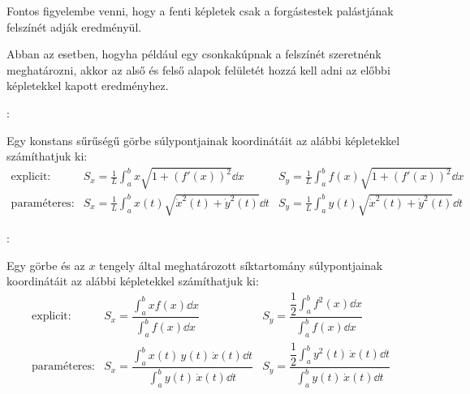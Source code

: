 \documentclass[a4paper, 12pt]{scrartcl}
\begin{document}
\begin{note}
  Fontos figyelembe venni, hogy a fenti képletek csak a forgástestek palástjának
  felszínét adják eredményül.

  Abban az esetben, hogyha például egy csonkakúpnak a felszínét szeretnénk
  meghatározni, akkor az alső és felső alapok felületét hozzá kell adni
  az előbbi képletekkel kapott eredményhez.
\end{note}

\begin{blueBox}
  :

  Egy konstans sűrűségű görbe súlypontjainak koordinátáit az alábbi képletekkel
  számíthatjuk ki:
  \[
    \begin{array}{lll}
      \text{explicit:}    & \displaystyle S_x = \frac{1}{L} \int_a^b x \sqrt{1 + (f'(x))^2} \dd x
                          & \displaystyle S_y = \frac{1}{L} \int_a^b f(x) \sqrt{1 + (f'(x))^2} \dd x
      \\[7mm]
      \text{paraméteres:} & \displaystyle S_x = \frac{1}{L} \int_a^b x(t) \sqrt{{\dot x}^2(t) + {\dot y}^2(t)} \dd t
                          & \displaystyle S_y = \frac{1}{L} \int_a^b y(t) \sqrt{{\dot x}^2(t) + {\dot y}^2(t)} \dd t
    \end{array}
  \]
\end{blueBox}

\begin{blueBox}
  :

  Egy görbe és az $x$ tengely által meghatározott síktartomány súlypontjainak
  koordinátáit az alábbi képletekkel számíthatjuk ki:
  \def\arraycolsep{20pt}
  \[
    \begin{array}{lll}
      \text{explicit:}    & \displaystyle S_x = \dfrac{\displaystyle\int_a^b x f(x) \dd x}{\displaystyle\int_a^b f(x) \dd x}
                          & \displaystyle S_y = \dfrac{\dfrac{1}{2} \displaystyle\int_a^b f^2(x) \dd x}{\displaystyle\int_a^b f(x) \dd x}
      \\[15mm]
      \text{paraméteres:} & \displaystyle S_x = \dfrac{\displaystyle\int_a^b x(t) \, y(t) \, \dot x(t) \dd t}{\displaystyle\int_a^b y(t) \, \dot x(t) \dd t}
                          & \displaystyle S_y = \dfrac{\dfrac{1}{2} \displaystyle\int_a^b y^2(t) \, \dot x(t) \dd t}{\displaystyle\int_a^b y(t) \, \dot x(t) \dd t}
    \end{array}
  \]
\end{blueBox}
\end{document}
